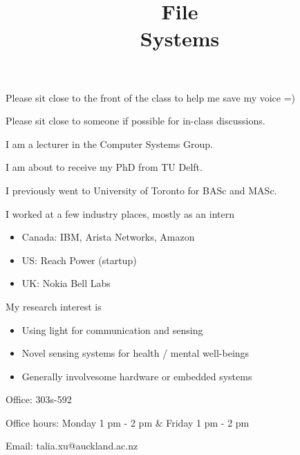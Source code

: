 

\title{File\\Systems}



\begin{slide}
	Please sit close to the front of the class to help me save my voice =)
	\bigskip
	
	Please sit close to someone if possible for in-class discussions.
\end{slide}

\begin{frame}
    \titlepage
\end{frame}

\begin{slide}

	
    I am a lecturer in the Computer Systems Group.
    \bigskip

    I am about to receive my PhD from TU Delft.
    \bigskip

   I previously went to University of Toronto for BASc and MASc.

\end{slide}

\begin{slide}


    I worked at a few industry places, mostly as an intern 
    \begin{itemize}
    	\item Canada: IBM, Arista Networks, Amazon
	\item US: Reach Power (startup)
	\item UK: Nokia Bell Labs
    \end{itemize}

    \bigskip
    My research interest is 
    \begin{itemize}
	\item Using light for communication and sensing
	\item Novel sensing systems for health / mental well-beings
	\item Generally involvesome hardware or embedded systems
    \end{itemize}

\end{slide}

\begin{slide}


    Office: 303s-592
    \bigskip

    Office hours: Monday 1 pm - 2 pm \& Friday 1 pm - 2 pm
    \bigskip

    Email: talia.xu@auckland.ac.nz

\end{slide}

